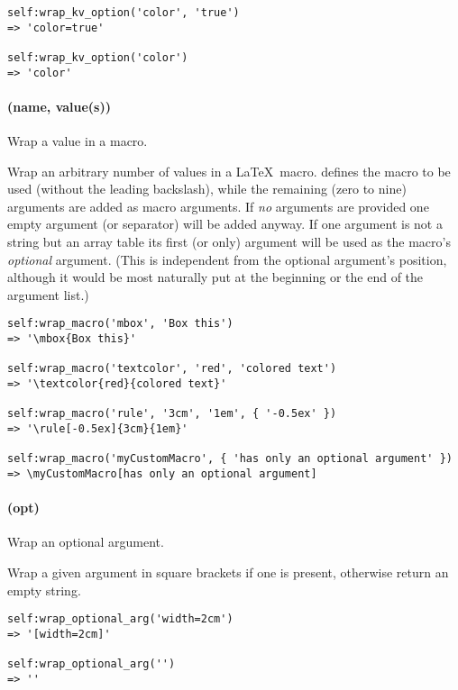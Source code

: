 \documentclass[12pt]{scrartcl}
\begin{document}
\begin{verbatim}
self:wrap_kv_option('color', 'true')
=> 'color=true'

self:wrap_kv_option('color')
=> 'color'
\end{verbatim}


\paragraph{ (name, value(s))}

Wrap a value in a macro.

\noindent Wrap an arbitrary number of values in a \LaTeX\ macro. 
defines the macro to be used (without the leading backslash), while the
remaining (zero to nine) arguments are added as macro arguments. If \emph{no}
arguments are provided one empty argument (or separator) will be added anyway.
If one argument is not a string but an array table its first (or only) argument
will be used as the macro's \emph{optional} argument. (This is independent from
the optional argument's position, although it would be most naturally put at the
beginning or the end of the argument list.)

\begin{verbatim}
self:wrap_macro('mbox', 'Box this')
=> '\mbox{Box this}'

self:wrap_macro('textcolor', 'red', 'colored text')
=> '\textcolor{red}{colored text}'

self:wrap_macro('rule', '3cm', '1em', { '-0.5ex' })
=> '\rule[-0.5ex]{3cm}{1em}'

self:wrap_macro('myCustomMacro', { 'has only an optional argument' })
=> \myCustomMacro[has only an optional argument]
\end{verbatim}


\paragraph{ (opt)}

Wrap an optional argument.

\noindent Wrap a given argument in square brackets if one is present, otherwise return an empty string.

\begin{verbatim}
self:wrap_optional_arg('width=2cm')
=> '[width=2cm]'

self:wrap_optional_arg('')
=> ''
\end{verbatim}
\end{document}
